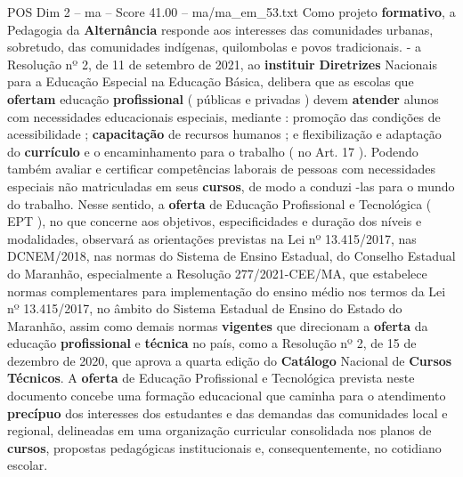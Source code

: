 \begin{textsample}{POS Dim 2 – ma – Score 41.00 – ma/ma\_em\_53.txt}
Como projeto \textbf{formativo}, a Pedagogia da \textbf{Alternância} responde aos interesses das comunidades urbanas, sobretudo, das comunidades indígenas, quilombolas e povos tradicionais. - a Resolução nº 2, de 11 de setembro de 2021, ao \textbf{instituir} \textbf{Diretrizes} Nacionais para a Educação Especial na Educação Básica, delibera que as escolas que \textbf{ofertam} educação \textbf{profissional} ( públicas e privadas ) devem \textbf{atender} alunos com necessidades educacionais especiais, mediante : promoção das condições de acessibilidade ; \textbf{capacitação} de recursos humanos ; e flexibilização e adaptação do \textbf{currículo} e o encaminhamento para o trabalho ( no Art. 17 ).
Podendo também avaliar e certificar competências laborais de pessoas com necessidades especiais não matriculadas em seus \textbf{cursos}, de modo a conduzi -las para o mundo do trabalho.
Nesse sentido, a \textbf{oferta} de Educação Profissional e Tecnológica ( EPT ), no que concerne aos objetivos, especificidades e duração dos níveis e modalidades, observará as orientações previstas na Lei nº 13.415/2017, nas DCNEM/2018, nas normas do Sistema de Ensino Estadual, do Conselho Estadual do Maranhão, especialmente a Resolução 277/2021-CEE/MA, que estabelece normas complementares para implementação do ensino médio nos termos da Lei nº 13.415/2017, no âmbito do Sistema Estadual de Ensino do Estado do Maranhão, assim como demais normas \textbf{vigentes} que direcionam a \textbf{oferta} da educação \textbf{profissional} e \textbf{técnica} no país, como a Resolução nº 2, de 15 de dezembro de 2020, que aprova a quarta edição do \textbf{Catálogo} Nacional de \textbf{Cursos} \textbf{Técnicos}.
A \textbf{oferta} de Educação Profissional e Tecnológica prevista neste documento concebe uma formação educacional que caminha para o atendimento \textbf{precípuo} dos interesses dos estudantes e das demandas das comunidades local e regional, delineadas em uma organização curricular consolidada nos planos de \textbf{cursos}, propostas pedagógicas institucionais e, consequentemente, no cotidiano escolar.

\end{textsample}
